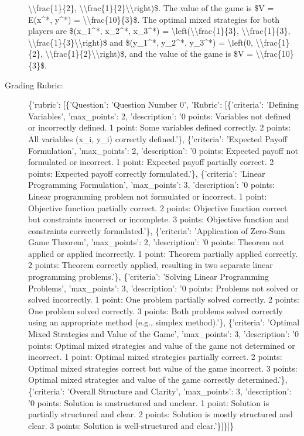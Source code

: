 \documentclass{article}%
\begin{document}
\begin{description}
\textbackslash{}\textbackslash{}frac\{1\}\{2\}, \textbackslash{}\textbackslash{}frac\{1\}\{2\}\textbackslash{}\textbackslash{}right)\$. The value of the game is \$V = E(x\^{}*, y\^{}*) = \textbackslash{}\textbackslash{}frac\{10\}\{3\}\$. The optimal mixed strategies for both players are \$(x\_1\^{}*, x\_2\^{}*, x\_3\^{}*) = \textbackslash{}left(\textbackslash{}\textbackslash{}frac\{1\}\{3\}, \textbackslash{}\textbackslash{}frac\{1\}\{3\}, \textbackslash{}\textbackslash{}frac\{1\}\{3\}\textbackslash{}\textbackslash{}right)\$ and \$(y\_1\^{}*, y\_2\^{}*, y\_3\^{}*) = \textbackslash{}left(0, \textbackslash{}\textbackslash{}frac\{1\}\{2\}, \textbackslash{}\textbackslash{}frac\{1\}\{2\}\textbackslash{}\textbackslash{}right)\$, and the value of the game is \$V = \textbackslash{}\textbackslash{}frac\{10\}\{3\}\$.%
\item[Grading Rubric: ]%
\{'rubric': {[}\{'Question': 'Question Number 0', 'Rubric': {[}\{'criteria': 'Defining Variables', 'max\_points': 2, 'description': '0 points: Variables not defined or incorrectly defined. 1 point: Some variables defined correctly. 2 points: All variables (x\_i, y\_i) correctly defined.'\}, \{'criteria': 'Expected Payoff Formulation', 'max\_points': 2, 'description': '0 points: Expected payoff not formulated or incorrect. 1 point: Expected payoff partially correct. 2 points: Expected payoff correctly formulated.'\}, \{'criteria': 'Linear Programming Formulation', 'max\_points': 3, 'description': '0 points: Linear programming problem not formulated or incorrect. 1 point: Objective function partially correct. 2 points: Objective function correct but constraints incorrect or incomplete. 3 points: Objective function and constraints correctly formulated.'\}, \{'criteria': 'Application of Zero{-}Sum Game Theorem', 'max\_points': 2, 'description': '0 points: Theorem not applied or applied incorrectly. 1 point: Theorem partially applied correctly. 2 points: Theorem correctly applied, resulting in two separate linear programming problems.'\}, \{'criteria': 'Solving Linear Programming Problems', 'max\_points': 3, 'description': '0 points: Problems not solved or solved incorrectly. 1 point: One problem partially solved correctly. 2 points: One problem solved correctly. 3 points: Both problems solved correctly using an appropriate method (e.g., simplex method).'\}, \{'criteria': 'Optimal Mixed Strategies and Value of the Game', 'max\_points': 3, 'description': '0 points: Optimal mixed strategies and value of the game not determined or incorrect. 1 point: Optimal mixed strategies partially correct. 2 points: Optimal mixed strategies correct but value of the game incorrect. 3 points: Optimal mixed strategies and value of the game correctly determined.'\}, \{'criteria': 'Overall Structure and Clarity', 'max\_points': 3, 'description': '0 points: Solution is unstructured and unclear. 1 point: Solution is partially structured and clear. 2 points: Solution is mostly structured and clear. 3 points: Solution is well{-}structured and clear.'\}{]}\}{]}\}%

\end{description}
\end{document}
